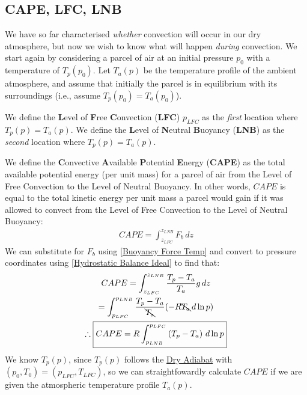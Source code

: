 \subsection{CAPE, LFC, LNB}

We have so far characterised \textit{whether} convection will occur in our dry atmosphere, but now we wish to know what will happen \textit{during} convection. We start again by considering a parcel of air at an initial pressure $p_0$ with a temperature of $T_p(p_0)$. Let $T_a(p)$ be the temperature profile of the ambient atmosphere, and assume that initially the parcel is in equilibrium with its surroundings (i.e., assume $T_p(p_0)=T_a(p_0)$).

We define the \textbf{L}evel of \textbf{F}ree \textbf{C}onvection (\textbf{LFC}) $p_{LFC}$ as the \textit{first} location where $T_p(p)=T_a(p)$. We define the \textbf{L}evel of \textbf{N}eutral \textbf{B}uoyancy (\textbf{LNB}) as the \textit{second} location where $T_p(p)=T_a(p)$.

We define the \textbf{C}onvective \textbf{A}vailable \textbf{P}otential \textbf{E}nergy (\textbf{CAPE}) as the total available potential energy (per unit mass) for a parcel of air from the Level of Free Convection to the Level of Neutral Buoyancy. In other words, $CAPE$ is equal to the total kinetic energy per unit mass a parcel would gain if it was allowed to convect from the Level of Free Convection to the Level of Neutral Buoyancy:
\begin{align}
    CAPE=\int_{z_{LFC}}^{z_{LNB}}F_b\,dz
\end{align}
We can substitute for $F_b$ using \ref{Buoyancy Force Temp} and convert to pressure coordinates using \ref{Hydrostatic Balance Ideal} to find that:
\begin{gather*}
    CAPE=\int_{z_{LFC}}^{z_{LNB}}\frac{T_p-T_a}{T_a}g\,dz\\
    =\int_{p_{LFC}}^{p_{LNB}}\frac{T_p-T_a}{\bcancel{T_a}}(-R\bcancel{T_a}\,d\ln p)\\
    \therefore \boxed{CAPE=R\int_{p_{LNB}}^{p_{LFC}}\left( T_p-T_a \right)\,d\ln p}
\end{gather*}
We know $T_p(p)$, since $T_p(p)$ follows the \hyperref[Dry Adiabat]{Dry Adiabat} with $(p_0,T_0)=(p_{LFC},T_{LFC})$, so we can straightfowardly calculate $CAPE$ if we are given the atmospheric temperature profile $T_a(p)$.

